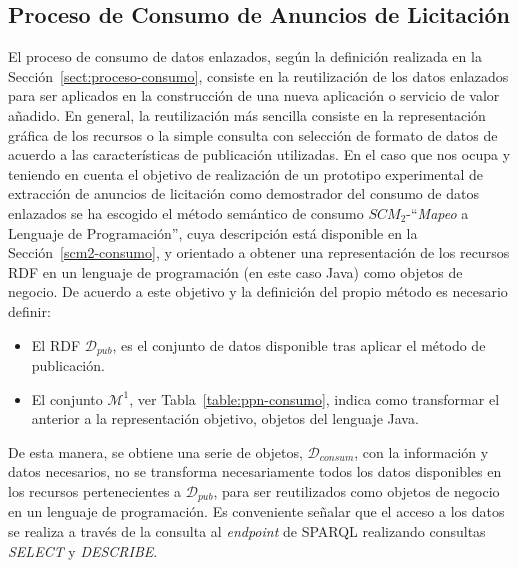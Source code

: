 \subsection{Proceso de Consumo de Anuncios de Licitación}
El proceso de consumo de datos enlazados, según la definición realizada en la Sección~\ref{sect:proceso-consumo}, consiste en 
la reutilización de los datos enlazados para ser aplicados en la construcción de una nueva aplicación o servicio de valor 
añadido. En general, la reutilización más sencilla consiste en la representación gráfica de los recursos o la simple 
consulta con selección de formato de datos de acuerdo a las características de publicación utilizadas. En el caso 
que nos ocupa y teniendo en cuenta el objetivo de realización de un prototipo experimental de extracción de anuncios 
de licitación como demostrador del consumo de datos enlazados se ha escogido el método semántico de consumo $SCM_2$-``\textit{Mapeo} a Lenguaje de Programación'', 
cuya descripción está disponible en la Sección~\ref{scm2-consumo}, y orientado a obtener una representación de los recursos RDF en un 
lenguaje de programación (en este caso Java) como objetos de negocio. De acuerdo a este objetivo y la definición del propio método 
es necesario definir:
\begin{itemize}
 \item El \dataset RDF $\mathcal{D}_{pub}$, es el conjunto de datos disponible tras aplicar el método de publicación.
 \item El conjunto $\mathcal{M}^1$, ver Tabla~\ref{table:ppn-consumo}, indica como transformar el \dataset anterior a la representación objetivo, objetos del lenguaje Java.
\end{itemize}
% 
De esta manera, se obtiene una serie de objetos, $\mathcal{D}_{consum}$, con la información y datos necesarios, no se transforma necesariamente todos los datos disponibles en los recursos pertenecientes 
a  $\mathcal{D}_{pub}$, para ser reutilizados como objetos de negocio en un lenguaje de programación. Es conveniente señalar que el acceso a los datos se realiza a través 
de la consulta al \textit{endpoint} de \gls{SPARQL} realizando consultas \textit{SELECT} y \textit{DESCRIBE}.



